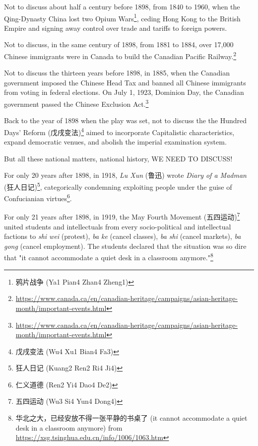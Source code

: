 \documentclass[12pt]{article}
\begin{document}
Not to discuss about half a century before 1898, from 1840 to 1960, when the Qing-Dynasty China lost two Opium Wars\footnote{鸦片战争 (Ya1 Pian4 Zhan4 Zheng1)}, ceding Hong Kong to the British Empire and signing away control over trade and tariffs to foreign powers.

Not to discuss, in the same century of 1898, from 1881 to 1884, over 17,000 Chinese immigrants were in Canada to build the Canadian Pacific Railway.\footnote{\href{https://www.canada.ca/en/canadian-heritage/campaigns/asian-heritage-month/important-events.html}{https://www.canada.ca/en/canadian-heritage/campaigns/asian-heritage-month/important-events.html}}

Not to discuss the thirteen years before 1898, in 1885, when the Canadian government imposed the Chinese Head Tax and banned all Chinese immigrants from voting in federal elections. On July 1, 1923, Dominion Day, the Canadian government passed the Chinese Exclusion Act.\footnote{\href{https://www.canada.ca/en/canadian-heritage/campaigns/asian-heritage-month/important-events.html}{https://www.canada.ca/en/canadian-heritage/campaigns/asian-heritage-month/important-events.html}}


Back to the year of 1898 when the play was set, not to discuss the the Hundred Days' Reform (戊戌变法)\footnote{戊戌变法 (Wu4 Xu1 Bian4 Fa3)} aimed to incorporate Capitalistic characteristics, expand democratic venues, and abolish the imperial examination system.

But all these national matters, national history, WE NEED TO DISCUSS!

For only 20 years after 1898, in 1918, \textit{Lu Xun} (鲁迅) wrote \textit{Diary of a Madman} (狂人日记)\footnote{狂人日记 (Kuang2 Ren2 Ri4 Ji4)}, categorically condemning exploiting people under the guise of Confucianian virtues\footnote{仁义道德 (Ren2 Yi4 Dao4 De2)}.

For only 21 years after 1898, in 1919, the May Fourth Movement (五四运动)\footnote{五四运动 (Wu3 Si4 Yun4 Dong4)} united students and intellectuals from every socio-political and intellectual factions to \textit{shi wei} (protest), \textit{ba ke} (cancel classes), \textit{ba shi} (cancel markets), \textit{ba gong} (cancel employment). The students declared that the situation was so dire that "it cannot accommodate a quiet desk in a classroom anymore."\footnote{华北之大，已经安放不得一张平静的书桌了 (it cannot accommodate a quiet desk in a classroom anymore) from \href{https://xsg.tsinghua.edu.cn/info/1006/1063.htm}{https://xsg.tsinghua.edu.cn/info/1006/1063.htm}}
\end{document}
